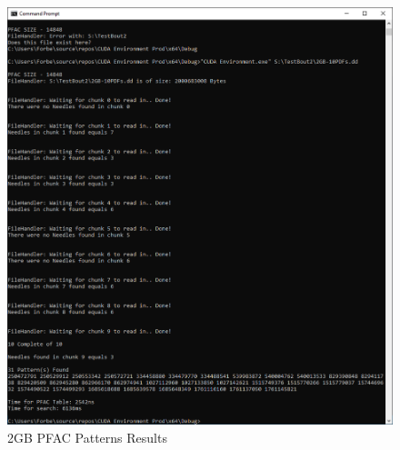 \begin{figure}[!ht]
    \centering
    \includegraphics[width=\linewidth]{Images/Tests/2GB/Aletheia.png}
    \caption{2\ac{GB} \ac{PFAC} Patterns Results}
    \label{fig:2gbPFACResultsMore}
\end{figure}
